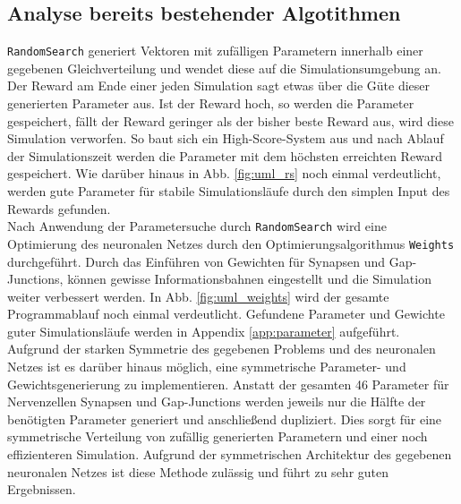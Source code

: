 	\subsection{Analyse bereits bestehender Algotithmen}
		\texttt{RandomSearch} generiert Vektoren mit zufälligen Parametern innerhalb einer gegebenen Gleichverteilung und wendet diese auf die Simulationsumgebung an. Der Reward am Ende einer jeden Simulation sagt etwas über die Güte dieser generierten Parameter aus. Ist der Reward hoch, so werden die Parameter gespeichert, fällt der Reward geringer als der bisher beste Reward aus, wird diese Simulation verworfen. So baut sich ein High-Score-System aus und nach Ablauf der Simulationszeit werden die Parameter mit dem höchsten erreichten Reward gespeichert.	Wie darüber hinaus in Abb. \ref{fig:uml_rs} noch einmal verdeutlicht, werden gute Parameter für stabile Simulationsläufe durch den simplen Input des Rewards gefunden.\\
		Nach Anwendung der Parametersuche durch \texttt{RandomSearch} wird eine Optimierung des neuronalen Netzes durch den Optimierungsalgorithmus \texttt{Weights} durchgeführt. Durch das Einführen von Gewichten für Synapsen und Gap-Junctions, können gewisse Informationsbahnen eingestellt und die Simulation weiter verbessert werden. In Abb. \ref{fig:uml_weights} wird der gesamte Programmablauf noch einmal verdeutlicht.	Gefundene Parameter und Gewichte guter Simulationsläufe werden in Appendix \ref{app:parameter} aufgeführt.\\
		Aufgrund der starken Symmetrie des gegebenen Problems und des neuronalen Netzes ist es darüber hinaus möglich, eine symmetrische Parameter- und Gewichtsgenerierung zu implementieren. Anstatt der gesamten 46 Parameter für Nervenzellen Synapsen und Gap-Junctions werden jeweils nur die Hälfte der benötigten Parameter generiert und anschließend dupliziert. Dies sorgt für eine symmetrische Verteilung von zufällig generierten Parametern und einer noch effizienteren Simulation. Aufgrund der symmetrischen Architektur des gegebenen neuronalen Netzes ist diese Methode zulässig und führt zu sehr guten Ergebnissen.
